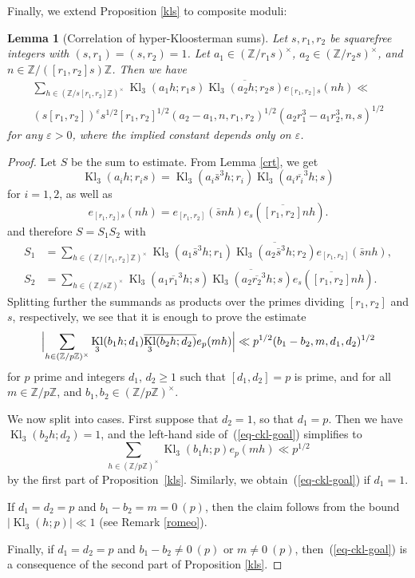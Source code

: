 \documentclass[12pt,a4paper,reqno]{amsart}
\numberwithin{equation}{section}
\DeclareMathOperator{\hypk}{Kl}
\theoremstyle{plain}
\newtheorem{lemma}[theorem]{Lemma}
\theoremstyle{definition}
\newcommand\Z{\mathbb{Z}}
\newcommand\eps{\varepsilon}
\begin{document}
Finally, we extend Proposition \ref{kls} to composite moduli:

\begin{lemma}[Correlation of hyper-Kloosterman sums]\label{lm-c-kl} Let $s,r_1,r_2$
  be squarefree integers with $(s,r_1)=(s,r_2)=1$. Let $a_1 \in
  (\Z/r_1 s)^\times$, $a_2 \in (\Z/r_2s)^\times$, and $n \in
  \Z/([r_1,r_2] s)\Z$.  Then we have
\begin{multline*}
  \sum_{h \in (\Z/s[r_1, r_2] \Z)^\times} \hypk_3(a_1 h; r_1 s)
  \overline{\hypk_3(a_2 h; r_2 s)} e_{[r_1,r_2] s}( nh )\ll
  \\
  (s[r_1,r_2])^{\eps} s^{1/2} [r_1,r_2]^{1/2}
  (a_2-a_1,n,r_1,r_2)^{1/2}(a_2 r_1^3 - a_1 r_2^3, n, s)^{1/2}
\end{multline*}
for any $\eps>0$, where the implied constant depends only on $\eps$.
\end{lemma}

\begin{proof} Let $S$ be the sum to estimate. From Lemma \ref{crt}, we
  get
$$ 
\hypk_3( a_i h; r_i s ) = \hypk_3( a_i \bar{s}^3 h; r_i) \hypk_3( a_i
\overline{r_i}^3 h; s )
$$ 
for $i=1,2$, as well as
$$
 e_{[r_1,r_2]s}(nh) = e_{[r_1,r_2]}(\bar{s}nh)
 e_s(\overline{[r_1,r_2]}nh).
$$
and therefore $S=S_1S_2$ with
\begin{align*}
  S_1&=\sum_{h \in (\Z/[r_1, r_2] \Z)^\times} \hypk_3(a_1 \bar{s}^3 h;
  r_1)
  \overline{\hypk_3(a_2 \bar{s}^3 h; r_2)} e_{[r_1,r_2]}( \bar{s} nh ),\\
  S_2&=\sum_{h \in (\Z/s \Z)^\times} \hypk_3(a_1 \overline{r_1}^3 h;
  s) \overline{\hypk_3(a_2 \overline{r_2}^3 h; s)} e_{s}(
  \overline{[r_1,r_2]} nh ).
\end{align*}
Splitting further the summands as products over the primes dividing
$[r_1,r_2]$ and $s$, respectively, we see that it is enough to prove
the estimate
\begin{equation}\label{eq-ckl-goal}
\Bigl|\sum_{h \in (\Z/p \Z)^\times} \hypk_3(b_1 h; d_1)
\overline{\hypk_3(b_2 h; d_2)} e_{p}( mh )\Bigr| \ll p^{1/2}
(b_1-b_2,m,d_1,d_2)^{1/2}
\end{equation}
for $p$ prime and integers $d_1$, $d_2\geq 1$ such that $[d_1,d_2] =
p$ is prime, and for all $m \in \Z/p\Z$, and $b_1,b_2 \in
(\Z/p\Z)^\times$.

We now split into cases.  First suppose that $d_2=1$, so that $d_1=p$.
Then we have $\hypk_3(b_2 h; d_2) = 1$, and the left-hand side
of~(\ref{eq-ckl-goal}) simplifies to
$$
\sum_{h \in (\Z/p \Z)^\times} \hypk_3(b_1 h; p) e_{p}( mh ) \ll p^{1/2}
$$
by the first part of Proposition~\ref{kls}. Similarly, we
obtain~(\ref{eq-ckl-goal}) if $d_1=1$.

If $d_1=d_2=p$ and $b_1-b_2=m=0\ (p)$, then the claim follows from the
bound $|\hypk_3(h; p)| \ll 1$ (see Remark \ref{romeo}).

Finally, if $d_1=d_2=p$ and $b_1-b_2 \neq 0\ (p)$ or $m \neq 0\ (p)$,
then~(\ref{eq-ckl-goal}) is a consequence of the second part of
Proposition \ref{kls}.
\end{proof}
\end{document}
